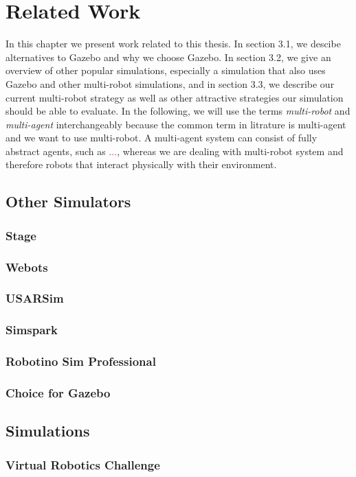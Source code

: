 \chapter{Related Work}
In this chapter we present work related to this thesis. In section 3.1, we descibe alternatives to Gazebo and why we choose Gazebo. In section 3.2, we give an overview of other popular simulations, especially a simulation that also uses Gazebo and other multi-robot simulations, and in section 3.3, we describe our current multi-robot strategy as well as other attractive strategies our simulation should be able to evaluate. In the following, we will use the terms \textit{multi-robot} and \textit{multi-agent} interchangeably because the common term in litrature is multi-agent and we want to use multi-robot. A multi-agent system can consist of fully abstract agents, such as \textcolor{red}{...}, whereas we are dealing with multi-robot system and therefore robots that interact physically with their environment.


\section{Other Simulators}
\subsection{Stage}
\subsection{Webots}
\subsection{USARSim}
\subsection{Simspark}
\subsection{Robotino Sim Professional}
\subsection{Choice for Gazebo}

\section{Simulations}
\subsection{Virtual Robotics Challenge}
